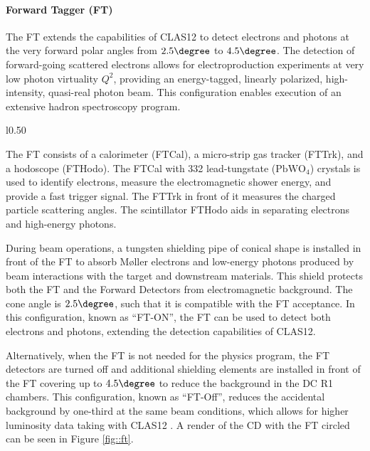 \paragraph{Forward Tagger (FT)}
    The FT extends the capabilities of CLAS12 to detect electrons and photons at the very forward polar angles from $2.5\degree$ to $4.5\degree$.
    The detection of forward-going scattered electrons allows for electroproduction experiments at very low photon virtuality $Q^2$, providing an energy-tagged, linearly polarized, high-intensity, quasi-real photon beam.
    This configuration enables execution of an extensive hadron spectroscopy program.

    \begin{wrapfigure}{l}{0.50\textwidth}
        \centering{}
        \caption[FT]{The Forward Tagger system circled downstream of the CD in front of the torus magnet warm bore entrance.}
        \label{fig::ft}
    \end{wrapfigure}

    The FT consists of a calorimeter (FTCal), a micro-strip gas tracker (FTTrk), and a hodoscope (FTHodo).
    The FTCal with 332 lead-tungstate ($\text{PbWO}_4$) crystals is used to identify electrons, measure the electromagnetic shower energy, and provide a fast trigger signal.
    The FTTrk in front of it measures the charged particle scattering angles.
    The scintillator FTHodo aids in separating electrons and high-energy photons.

    During beam operations, a tungsten shielding pipe of conical shape is installed in front of the FT to absorb M\o ller electrons and low-energy photons produced by beam interactions with the target and downstream materials.
    This shield protects both the FT and the Forward Detectors from electromagnetic background.
    The cone angle is $2.5\degree$, such that it is compatible with the FT acceptance.
    In this configuration, known as ``FT-ON'', the FT can be used to detect both electrons and photons, extending the detection capabilities of CLAS12.

    Alternatively, when the FT is not needed for the physics program, the FT detectors are turned off and additional shielding elements are installed in front of the FT covering up to $4.5\degree$ to reduce the background in the DC R1 chambers.
    This configuration, known as ``FT-Off'', reduces the accidental background by one-third at the same beam conditions, which allows for higher luminosity data taking with CLAS12 \cite{acker2020ft}.
    A render of the CD with the FT circled can be seen in Figure \ref{fig::ft}.
